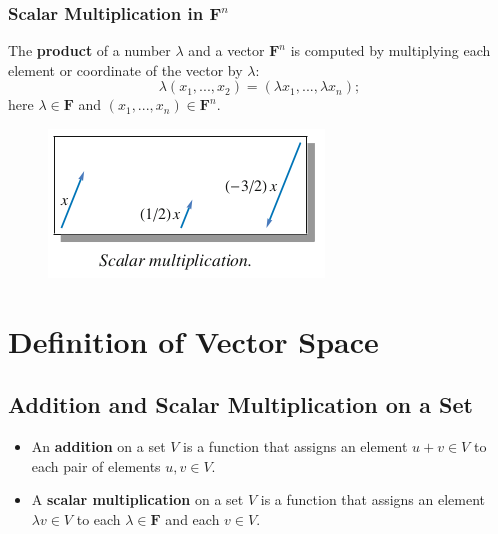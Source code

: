 \documentclass{article}
\begin{document}
	\subsubsection{Scalar Multiplication in $\mathbf{F}^n$}
	The \textbf{product} of a number $\lambda$ and a vector $\mathbf{F}^n$ is computed by multiplying each element or coordinate of the vector by $\lambda$:
	\begin{equation*}
		\lambda\left( x_1, ..., x_2 \right) = \left( \lambda x_1, ..., \lambda x_n \right);
	\end{equation*}
	here $\lambda\in\mathbf{F}$ and $(x_1, ..., x_n)\in \mathbf{F}^n$.
	\begin{figure}[h!]
	\includegraphics{scalar-vector-multiplication.png}
	\end{figure}

	\section{Definition of Vector Space}
	\subsection{Addition and Scalar Multiplication on a Set}
	\begin{itemize}
		\item An \textbf{addition} on a set $V$ is a function that assigns an element $u + v \in V$ to each pair of elements $u, v \in V$.
		\item A \textbf{scalar multiplication} on a set $V$ is a function that assigns an element $\lambda v \in V$ to each $\lambda \in \mathbf{F}$ and each $v \in V$.
	\end{itemize}
\end{document}
